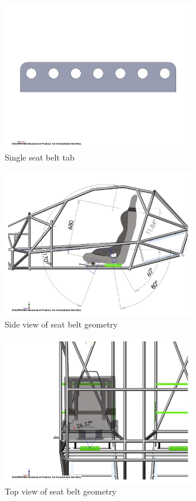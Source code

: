 \documentclass[10pt]{article}
\begin{document}
\begin{figure}[H]
\centering
\includegraphics[width=0.75\textwidth]{figures/seat-belt-tab}
\caption{Single seat belt tab}
\label{fig:seat-belt-tab}
\end{figure}

\begin{figure}[H]
\centering
\includegraphics[width=0.75\textwidth]{figures/seat-belt-side-view}
\caption{Side view of seat belt geometry}
\label{fig:seat-belt-side-view}
\end{figure}

\begin{figure}[H]
\centering
\includegraphics[width=0.75\textwidth]{figures/seat-belt-top-view}
\caption{Top view of seat belt geometry}
\label{fig:seat-belt-top-view}
\end{figure}
\end{document}
